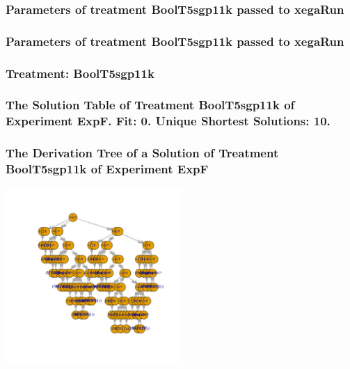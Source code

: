 \documentclass[18pt,c]{beamer}
\begin{document}

 \begin{frame}
 \fontsize{8pt}{9pt}\selectfont
 \frametitle{  Parameters of treatment BoolT5sgp11k passed to xegaRun
 }

 \label{ExpFtParmTable006.tex}  
 \end{frame}


 \begin{frame}
 \fontsize{8pt}{9pt}\selectfont
 \frametitle{  Parameters of treatment BoolT5sgp11k passed to xegaRun
 }

 \label{ExpFtParmTable007.tex}  
 \end{frame}

 \begin{frame}
 \fontsize{8pt}{9pt}\selectfont
 \frametitle{ Treatment: BoolT5sgp11k }

 \label{ExpFStatsTable007.tex}  
 \end{frame}

 \begin{frame}
 \fontsize{8pt}{9pt}\selectfont
 \frametitle{ The Solution Table of Treatment BoolT5sgp11k of Experiment ExpF. Fit: 0. Unique Shortest Solutions: 10. }

 \label{ExpFSolutionTable001.tex}  
 \end{frame}

 \begin{frame}
 \frametitle{ The Derivation Tree of a Solution of Treatment BoolT5sgp11k of Experiment ExpF }
 \begin{center}
\includegraphics[width=0.5\textwidth, angle=0]
{ExpFDerivationTreeFigure001.pdf}
 \end{center}
 \label{report/ExpFDerivationTreeFigure001.pdf}  
 \end{frame}
\end{document}
